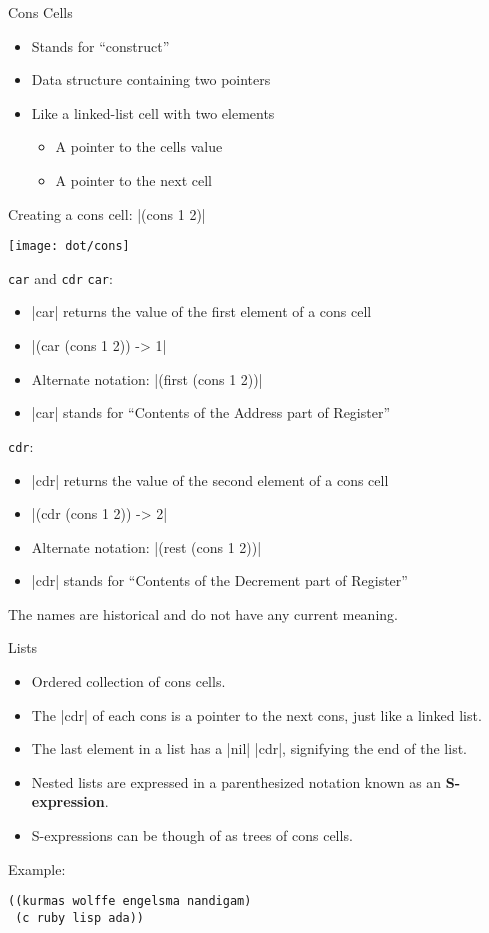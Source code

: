 \documentclass{beamer}
\begin{document}

\begin{frame}{Cons Cells}
  \begin{itemize}
  \item Stands for ``construct''
  \item Data structure containing two pointers
  \item Like a linked-list cell with two elements
    \begin{itemize}
    \item A pointer to the cells value
    \item A pointer to the next cell
    \end{itemize}
  \end{itemize}

  Creating a cons cell: \cl|(cons 1 2)|

  \texttt{[image: dot/cons]}
\end{frame}

\begin{frame}{\texttt{car} and \texttt{cdr}}
  \texttt{car}:
  \begin{itemize}
  \item \cl|car| returns the value of the first element of a cons cell
  \item \cl|(car (cons 1 2)) -> 1|
  \item Alternate notation: \cl|(first (cons 1 2))|
  \item \cl|car| stands for ``Contents of the Address part of Register''
  \end{itemize}
  \texttt{cdr}:
  \begin{itemize}
  \item \cl|cdr| returns the value of the second element of a cons cell
  \item \cl|(cdr (cons 1 2)) -> 2|
  \item Alternate notation: \cl|(rest (cons 1 2))|
  \item \cl|cdr| stands for ``Contents of the Decrement part of Register''
  \end{itemize}
  The names are historical and do not have any current meaning.
\end{frame}

\begin{frame}[fragile]{Lists}
\begin{itemize}
\item Ordered collection of cons cells.
\item The \cl|cdr| of each cons is a pointer to the next cons, just like a linked list.
\item The last element in a list has a \cl|nil| \cl|cdr|, signifying the end of the list.
\item Nested lists are expressed in a parenthesized notation known as an \textbf{S-expression}.
\item S-expressions can be though of as trees of cons cells.
\end{itemize}
Example:
\begin{verbatim}
((kurmas wolffe engelsma nandigam)
 (c ruby lisp ada))
\end{verbatim}
\end{frame}
\end{document}
